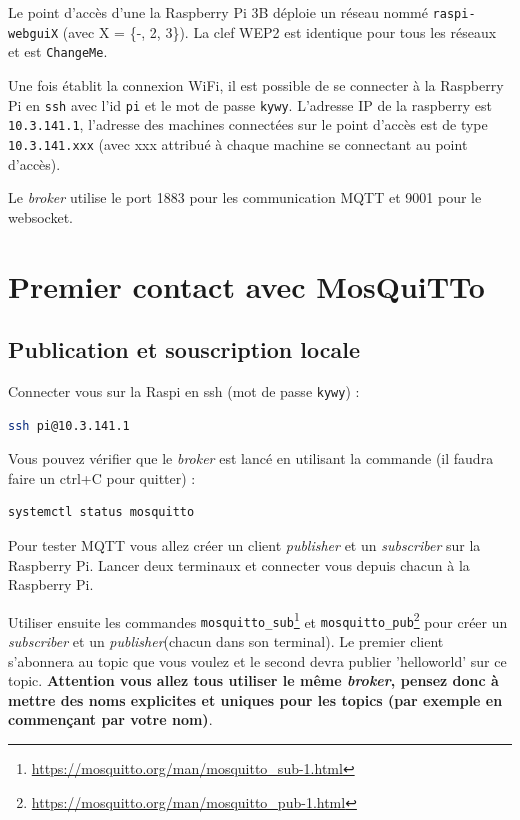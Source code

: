 \documentclass[11pt]{paper}
\newcommand\rasp{Raspberry Pi\xspace}
\newcommand\sub{{\it subscriber}\xspace}
\newcommand\pub{{\it publisher}\xspace}
\newcommand\broker{{\it broker}\xspace}
\begin{document}
Le point d'accès d'une la \rasp 3B déploie un réseau nommé {\tt raspi-webguiX} (avec X = \{-, 2, 3\}). La clef WEP2 est identique pour tous les réseaux et est {\tt ChangeMe}.

Une fois établit la connexion WiFi, il est possible de se connecter à la \rasp en {\tt ssh} avec l'id {\tt pi} et le mot de passe {\tt kywy}. L'adresse IP de la raspberry est {\tt 10.3.141.1}, l'adresse des machines connectées sur le point d'accès est de type {\tt 10.3.141.xxx} (avec xxx attribué à chaque machine se connectant au point d'accès).

Le \broker utilise le port 1883 pour les communication MQTT et 9001 pour le websocket.


  \section{Premier contact avec MosQuiTTo}

\subsection{Publication et souscription locale}

Connecter vous sur la Raspi en ssh (mot de passe {\tt kywy}) :
\begin{lstlisting}[language=bash]
ssh pi@10.3.141.1
\end{lstlisting}

Vous pouvez vérifier que le \broker est lancé en utilisant la commande (il faudra faire un ctrl+C pour quitter) :
\begin{lstlisting}[language=bash]
systemctl status mosquitto 
\end{lstlisting}

Pour tester MQTT vous allez créer un client \pub et un \sub sur la \rasp. Lancer deux terminaux et connecter vous depuis chacun à la \rasp.

Utiliser ensuite les commandes {\tt mosquitto\_sub}\footnote{\href{https://mosquitto.org/man/mosquitto_sub-1.html}{https://mosquitto.org/man/mosquitto\_sub-1.html}} et {\tt mosquitto\_pub}\footnote{\href{https://mosquitto.org/man/mosquitto_pub-1.html}{https://mosquitto.org/man/mosquitto\_pub-1.html}} pour créer un \sub et un \pub (chacun dans son terminal). Le premier client s'abonnera au topic que vous voulez et le second devra publier 'helloworld' sur ce topic. {\bf Attention vous allez tous utiliser le même \broker, pensez donc à mettre des noms explicites et uniques pour les topics (par exemple en commençant par votre nom)}.
\end{document}
